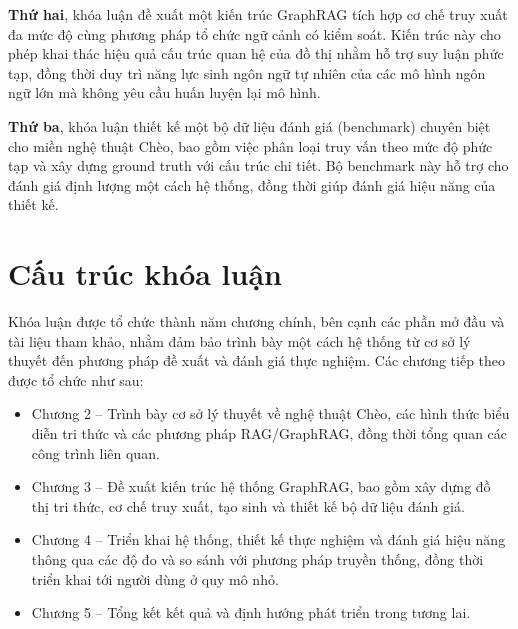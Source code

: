 \textbf{Thứ hai}, khóa luận đề xuất một kiến trúc GraphRAG tích hợp cơ chế truy xuất đa mức độ cùng phương pháp tổ chức ngữ cảnh có kiểm soát. Kiến trúc này cho phép khai thác hiệu quả cấu trúc quan hệ của đồ thị nhằm hỗ trợ suy luận phức tạp, đồng thời duy trì năng lực sinh ngôn ngữ tự nhiên của các mô hình ngôn ngữ lớn mà không yêu cầu huấn luyện lại mô hình.

\textbf{Thứ ba}, khóa luận thiết kế một bộ dữ liệu đánh giá (benchmark) chuyên biệt cho miền nghệ thuật Chèo, bao gồm việc phân loại truy vấn theo mức độ phức tạp và xây dựng ground truth với cấu trúc chi tiết. Bộ benchmark này hỗ trợ cho đánh giá định lượng một cách hệ thống, đồng thời giúp đánh giá hiệu năng của thiết kế.

\section{Cấu trúc khóa luận}

Khóa luận được tổ chức thành năm chương chính, bên cạnh các phần mở đầu và tài liệu tham khảo, nhằm đảm bảo trình bày một cách hệ thống từ cơ sở lý thuyết đến phương pháp đề xuất và đánh giá thực nghiệm. Các chương tiếp theo được tổ chức như sau:

\begin{itemize}
    \item Chương 2 – Trình bày cơ sở lý thuyết về nghệ thuật Chèo, các hình thức biểu diễn tri thức và các phương pháp RAG/GraphRAG, đồng thời tổng quan các công trình liên quan.
    \item Chương 3 – Đề xuất kiến trúc hệ thống GraphRAG, bao gồm xây dựng đồ thị tri thức, cơ chế truy xuất, tạo sinh và thiết kế bộ dữ liệu đánh giá.
    \item Chương 4 – Triển khai hệ thống, thiết kế thực nghiệm và đánh giá hiệu năng thông qua các độ đo và so sánh với phương pháp truyền thống, đồng thời triển khai tới người dùng ở quy mô nhỏ.
    \item Chương 5 – Tổng kết kết quả và định hướng phát triển trong tương lai.
\end{itemize}

